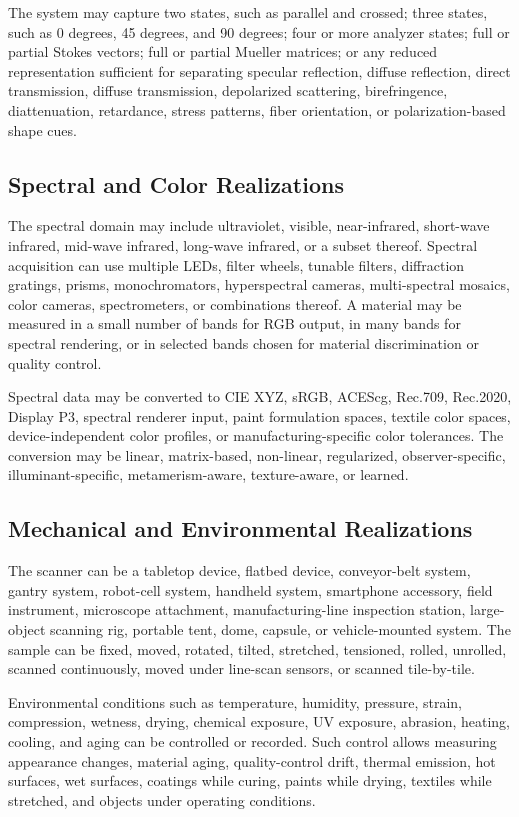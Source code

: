 \documentclass[11pt, twoside, listof=totocnumbered, bibliography=totocnumbered]{scrartcl}
\begin{document}
	The system may capture two states, such as parallel and crossed; three states, such as 0 degrees, 45 degrees, and 90 degrees; four or more analyzer states; full or partial Stokes vectors; full or partial Mueller matrices; or any reduced representation sufficient for separating specular reflection, diffuse reflection, direct transmission, diffuse transmission, depolarized scattering, birefringence, diattenuation, retardance, stress patterns, fiber orientation, or polarization-based shape cues.
	
	\subsection{Spectral and Color Realizations}
	The spectral domain may include ultraviolet, visible, near-infrared, short-wave infrared, mid-wave infrared, long-wave infrared, or a subset thereof. Spectral acquisition can use multiple LEDs, filter wheels, tunable filters, diffraction gratings, prisms, monochromators, hyperspectral cameras, multi-spectral mosaics, color cameras, spectrometers, or combinations thereof. A material may be measured in a small number of bands for RGB output, in many bands for spectral rendering, or in selected bands chosen for material discrimination or quality control.
	
	Spectral data may be converted to CIE XYZ, sRGB, ACEScg, Rec.709, Rec.2020, Display P3, spectral renderer input, paint formulation spaces, textile color spaces, device-independent color profiles, or manufacturing-specific color tolerances. The conversion may be linear, matrix-based, non-linear, regularized, observer-specific, illuminant-specific, metamerism-aware, texture-aware, or learned.
	
	\subsection{Mechanical and Environmental Realizations}
	The scanner can be a tabletop device, flatbed device, conveyor-belt system, gantry system, robot-cell system, handheld system, smartphone accessory, field instrument, microscope attachment, manufacturing-line inspection station, large-object scanning rig, portable tent, dome, capsule, or vehicle-mounted system. The sample can be fixed, moved, rotated, tilted, stretched, tensioned, rolled, unrolled, scanned continuously, moved under line-scan sensors, or scanned tile-by-tile.
	
	Environmental conditions such as temperature, humidity, pressure, strain, compression, wetness, drying, chemical exposure, UV exposure, abrasion, heating, cooling, and aging can be controlled or recorded. Such control allows measuring appearance changes, material aging, quality-control drift, thermal emission, hot surfaces, wet surfaces, coatings while curing, paints while drying, textiles while stretched, and objects under operating conditions.
	
\end{document}
